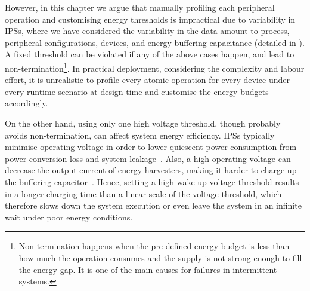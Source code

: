 
However, in this chapter we argue that manually profiling each peripheral operation and customising energy thresholds is impractical due to variability in IPSs, where we have considered the variability in the data amount to process, peripheral configurations, devices, and energy buffering capacitance (detailed in ). 
A fixed threshold can be violated if any of the above cases happen, and lead to non-termination\footnote{Non-termination happens when the pre-defined energy budget is less than how much the operation consumes and the supply is not strong enough to fill the energy gap. It is one of the main causes for failures in intermittent systems. }.
In practical deployment, considering the complexity and labour effort, it is unrealistic to profile every atomic operation for every device under every runtime scenario at design time and customise the energy budgets accordingly. 



On the other hand, using only one high voltage threshold, though probably avoids non-termination, can affect system energy efficiency. 
IPSs typically minimise operating voltage in order to lower quiescent power consumption from power conversion loss and system leakage~\cite{gomez2016dynamic}. 
Also, a high operating voltage can decrease the output current of energy harvesters, making it harder to charge up the buffering capacitor~\cite{pan2017maximize}.
Hence, setting a high wake-up voltage threshold results in a longer charging time than a linear scale of the voltage threshold, which therefore slows down the system execution or even leave the system in an infinite wait under poor energy conditions.



